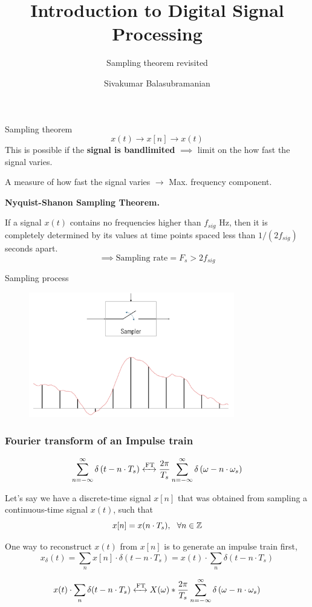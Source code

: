 \documentclass[aspectratio=169]{beamer}
\title{Introduction to Digital Signal Processing}
\subtitle{Sampling theorem revisited}
\author{Sivakumar Balasubramanian}
\institute[Christian Medical College] %
{
  \inst{}%
  Department of Bioengineering\\
  Christian Medical College, Bagayam\\
  Vellore 632002
}
\date{}
\def\mb{\ensuremath\mathbb}
\def\lp{\ensuremath\left(}
\def\rp{\ensuremath\right)}
\begin{document}
\begin{frame}
  \titlepage
\end{frame}


\begin{frame}[t]{Sampling theorem}
\[ x(t) \longrightarrow x[n] \longrightarrow x(t) \]
This is possible if the \textbf{signal is bandlimited} $\implies$ limit on the how fast the signal varies.

\vspace{0.5cm}
A measure of how fast the signal varies $\longrightarrow$ Max. frequency component.

\vspace{0.5cm}
\textbf{Nyquist-Shanon Sampling Theorem.}

If a signal $x(t)$ contains no frequencies higher than $f_{sig}$ Hz, then it is completely determined by its values at time points spaced less than $1 / ( 2 f_{sig} )$ seconds apart.
\[ \implies \text{Sampling rate} = F_s > 2 f_{sig} \]
\end{frame}


\begin{frame}[t]{Sampling process}
\begin{figure}
\includegraphics[width=0.8\textwidth, left]{img/sampler.png}
\end{figure}
\end{frame}


\begin{frame}[t]
  \frametitle{Fourier transform of an Impulse train}
  
  \[ \sum_{n=-\infty}^{\infty} \delta\lp t - n \cdot T_s\rp \xleftrightarrow{\text{FT}} \frac{2\pi}{T_s} \sum_{n=-\infty}^{\infty} \delta\lp \omega - n \cdot \omega_s\rp \]

  Let's say we have a discrete-time signal $x[n]$ that was obtained from sampling a continuous-time signal $x(t)$, such that
  \[ x[n] = x(n \cdot T_s), \,\,\ \forall n \in \mb{Z} \]

  One way to reconstruct $x(t)$ from $x[n]$ is to generate an impulse train first,
  \[ x_\delta (t) = \sum_{n} x[n] \cdot \delta(t - n\cdot T_s) = x(t) \cdot \sum_n \delta(t - n\cdot T_s) \]

  \[ x(t) \cdot \sum_n \delta ( t - n\cdot T_s ) \xleftrightarrow{\text{FT}} X( \omega ) * \frac{2\pi}{T_s} \sum_{n=-\infty}^{\infty} \delta\lp \omega - n \cdot \omega_s \rp \]

\end{frame}
\end{document}

